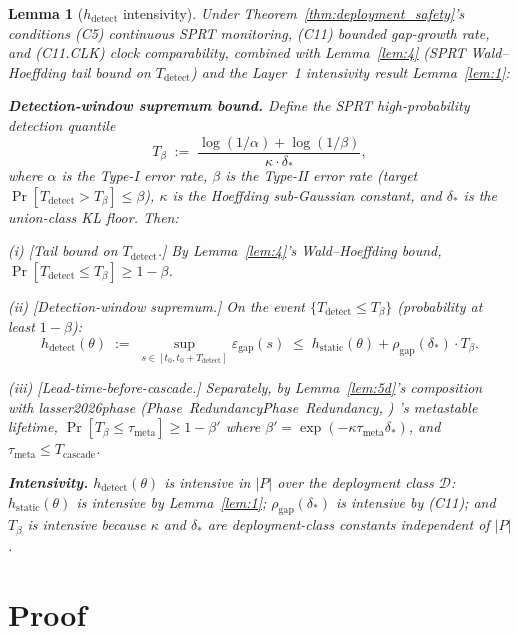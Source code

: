 \documentclass{article}
\makeatletter
\newcommand{\citep}[2][]{%
  \begingroup
  \def\@tmpkey{#2}%
  \ifx\@tmpkey\@empty\else
    (\ifx\@empty#1\@empty\else #1, \fi
     \@nameuse{bibkey@\@tmpkey})%
  \fi
  \endgroup
}
\newtheorem{lemma}{Lemma}
\newcommand{\deltastar}{\delta_{*}}
\newcommand{\rhogap}{\rho_{\mathrm{gap}}}
\newcommand{\epsgap}{\varepsilon_{\mathrm{gap}}}
\newcommand{\Tbeta}{T_{\beta}}
\makeatother
\begin{document}
\begin{lemma}[$h_{\mathrm{detect}}$ intensivity]
\label{lem:6}
Under Theorem~\ref{thm:deployment_safety}'s conditions (C5)
continuous SPRT monitoring, (C11) bounded gap-growth rate, and
(C11.CLK) clock comparability, combined with Lemma~\ref{lem:4}
(SPRT Wald--Hoeffding tail bound on $T_{\mathrm{detect}}$) and the
Layer~1 intensivity result Lemma~\ref{lem:1}:

\textbf{Detection-window supremum bound.}  Define the SPRT
high-probability detection quantile
\[
  \Tbeta \;:=\;
  \frac{\log(1/\alpha) + \log(1/\beta)}{\kappa \cdot \deltastar},
\]
where $\alpha$ is the Type-I error rate, $\beta$ is the Type-II
error rate (target $\Pr[T_{\mathrm{detect}} > \Tbeta] \leq \beta$),
$\kappa$ is the Hoeffding sub-Gaussian constant, and $\deltastar$
is the union-class KL floor.  Then:

(i) [Tail bound on $T_{\mathrm{detect}}$.]  By Lemma~\ref{lem:4}'s
Wald--Hoeffding bound,
$\Pr[T_{\mathrm{detect}} \leq \Tbeta] \geq 1 - \beta$.

(ii) [Detection-window supremum.]  On the event
$\{T_{\mathrm{detect}} \leq \Tbeta\}$ (probability at least
$1-\beta$):
\[
  h_{\mathrm{detect}}(\theta) \;:=\;
  \sup_{s \in [t_0, t_0 + T_{\mathrm{detect}}]} \epsgap(s)
  \;\leq\; h_{\mathrm{static}}(\theta) + \rhogap(\deltastar) \cdot
  \Tbeta.
\]

(iii) [Lead-time-before-cascade.]  Separately, by
Lemma~\ref{lem:5d}'s composition with
\citep[Phase~Redundancy]{lasser2026phase}'s metastable lifetime,
$\Pr[\Tbeta \leq \tau_{\mathrm{meta}}] \geq 1 - \beta'$ where
$\beta' = \exp(-\kappa \tau_{\mathrm{meta}} \deltastar)$, and
$\tau_{\mathrm{meta}} \leq T_{\mathrm{cascade}}$.

\textbf{Intensivity.}  $h_{\mathrm{detect}}(\theta)$ is intensive
in $|P|$ over the deployment class $\mathcal{D}$:
$h_{\mathrm{static}}(\theta)$ is intensive by Lemma~\ref{lem:1};
$\rhogap(\deltastar)$ is intensive by (C11); and $\Tbeta$ is
intensive because $\kappa$ and $\deltastar$ are deployment-class
constants independent of $|P|$.
\end{lemma}

\section{Proof}
\end{document}
